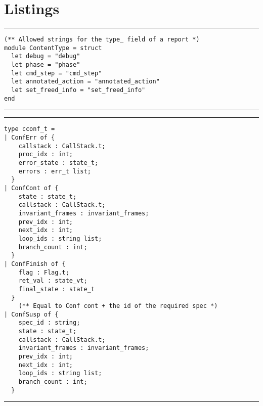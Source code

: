 
\appendix
\chapter{Listings}

\noindent\rule{\textwidth}{0.5pt}
\vspace{-0.6cm}
\begin{verbatim}
(** Allowed strings for the type_ field of a report *)
module ContentType = struct
  let debug = "debug"
  let phase = "phase"
  let cmd_step = "cmd_step"
  let annotated_action = "annotated_action"
  let set_freed_info = "set_freed_info"
end
\end{verbatim}
\vspace{-0.4cm}
\noindent\rule{\textwidth}{0.5pt}
\vspace{-0.6cm}
\label{lst:loggingconstants}

\vspace{2em}
\noindent\rule{\textwidth}{0.5pt}
\vspace{-0.6cm}
\begin{verbatim}
type cconf_t =
| ConfErr of {
    callstack : CallStack.t;
    proc_idx : int;
    error_state : state_t;
    errors : err_t list;
  }
| ConfCont of {
    state : state_t;
    callstack : CallStack.t;
    invariant_frames : invariant_frames;
    prev_idx : int;
    next_idx : int;
    loop_ids : string list;
    branch_count : int;
  }
| ConfFinish of {
    flag : Flag.t;
    ret_val : state_vt;
    final_state : state_t
  }
    (** Equal to Conf cont + the id of the required spec *)
| ConfSusp of {
    spec_id : string;
    state : state_t;
    callstack : CallStack.t;
    invariant_frames : invariant_frames;
    prev_idx : int;
    next_idx : int;
    loop_ids : string list;
    branch_count : int;
  }
\end{verbatim}
\vspace{-0.4cm}
\noindent\rule{\textwidth}{0.5pt}
\vspace{-0.6cm}
\label{lst:cconf-type}

